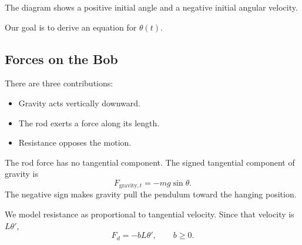 \documentclass[11pt,letterpaper]{article}
\begin{document}
The diagram shows a positive initial angle and
a negative initial angular velocity.

Our goal is to derive an equation for $\theta(t)$.

\subsection{Forces on the Bob}

There are three contributions:
\begin{itemize}
    \item Gravity acts vertically downward.
    \item The rod exerts a force along its length.
    \item Resistance opposes the motion.
\end{itemize}

The rod force has no tangential component.
The signed tangential component of gravity is
\[
F_{\mathrm{gravity},t}=-mg\sin\theta.
\]
The negative sign makes gravity pull the pendulum
toward the hanging position.

We model resistance as proportional to tangential
velocity. Since that velocity is $L\theta'$,
\[
F_d=-bL\theta',
\qquad b\ge0.
\]
\end{document}
